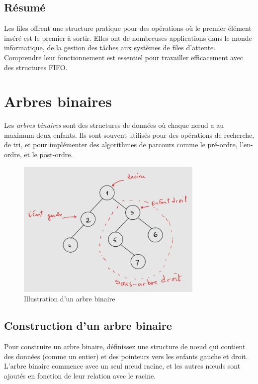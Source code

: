 \subsection{Résumé}
Les files offrent une structure pratique pour des opérations où le premier élément inséré est le premier à sortir. Elles ont de nombreuses applications dans le monde informatique, de la gestion des tâches aux systèmes de files d'attente. Comprendre leur fonctionnement est essentiel pour travailler efficacement avec des structures FIFO.

\section{Arbres binaires}

Les \emph{arbres binaires} sont des structures de données où chaque nœud a au maximum deux enfants. Ils sont souvent utilisés pour des opérations de recherche, de tri, et pour implémenter des algorithmes de parcours comme le pré-ordre, l'en-ordre, et le post-ordre.

\begin{figure}[H]
	\centering
	 \includegraphics[width=0.8\textwidth]{image/binary_tree}  %
	\caption{Illustration d'un arbre binaire}
\end{figure}

\subsection{Construction d'un arbre binaire}
Pour construire un arbre binaire, définissez une structure de nœud qui contient des données (comme un entier) et des pointeurs vers les enfants gauche et droit. L'arbre binaire commence avec un seul nœud racine, et les autres nœuds sont ajoutés en fonction de leur relation avec le racine.

